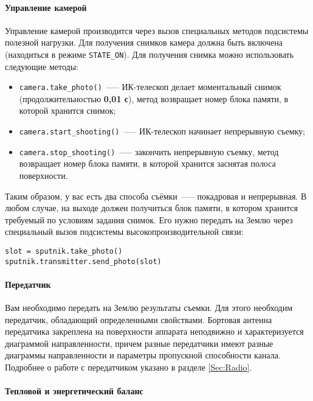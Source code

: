 \documentclass[12pt,a4paper]{article}
\begin{document}
\paragraph{Управление камерой}

Управление камерой производится через вызов специальных методов подсистемы полезной
нагрузки. Для получения снимков камера должна быть включена (находиться в режиме
\verb'STATE_ON'). Для получения снимка можно использовать следующие методы:

\begin{itemize}
\item \verb'camera.take_photo()'~--— ИК-телескоп делает моментальный снимок
  (продолжительностью \textbf{0,01 с}), метод возвращает номер блока памяти, в которой хранится
  снимок;
\item \verb'camera.start_shooting()'~--— ИК-телескоп начинает непрерывную съемку;
\item \verb'camera.stop_shooting()'~--— закончить непрерывную съемку, метод возвращает
  номер блока памяти, в которой хранится заснятая полоса поверхности.
\end{itemize}

Таким образом, у вас есть два способа съёмки~--— покадровая и непрерывная. В любом случае,
на выходе должен получиться блок памяти, в котором хранится требуемый по условиям задания
снимок. Его нужно передать на Землю через специальный вызов подсистемы
высокопроизводительной связи:

\begin{verbatim}
slot = sputnik.take_photo()
sputnik.transmitter.send_photo(slot)
\end{verbatim}

\paragraph{Передатчик}

Вам необходимо передать на Землю результаты съемки. Для этого необходим передатчик,
обладающий определенными свойствами. Бортовая антенна передатчика закреплена  на
поверхности аппарата неподвижно и характеризуется диаграммой направленности, причем разные
передатчики имеют разные диаграммы направленности и параметры пропускной способности
канала. Подробнее о работе с передатчиком указано в разделе \ref{Sec:Radio}.

\paragraph{Тепловой и энергетический баланс}
\end{document}
